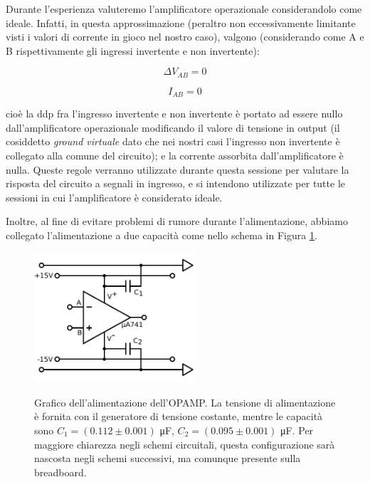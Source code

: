 Durante l'esperienza valuteremo l'amplificatore operazionale considerandolo come ideale. Infatti, in questa approssimazione (peraltro non eccessivamente limitante visti i valori di corrente in gioco nel nostro caso), valgono (considerando come A e B rispettivamente gli ingressi invertente e non invertente):

\begin{equation}
\Delta V_{AB}=0
\label{eq:regola_V}
\end{equation}

\begin{equation}
I_{AB}=0
\label{eq:regola_I}
\end{equation}

cioè la ddp fra l'ingresso invertente e non invertente è portato ad essere nullo dall'amplificatore operazionale modificando il valore di tensione in output (il cosiddetto \textit{ground virtuale} dato che nei nostri casi l'ingresso non invertente è collegato alla comune del circuito); e la corrente assorbita dall'amplificatore è nulla.
Queste regole verranno utilizzate durante questa sessione per valutare la risposta del circuito a segnali in ingresso, e si intendono utilizzate per tutte le sessioni in cui l'amplificatore è considerato ideale.

Inoltre, al fine di evitare problemi di rumore durante l'alimentazione, abbiamo collegato l'alimentazione a due capacità come nello schema in Figura \ref{gr:costante}.

\begin{figure}[ht]
 \centering
   {\includegraphics[width=6cm]{../E01/latex/alimentazione.pdf}}
 \caption{Grafico dell'alimentazione dell'OPAMP. La tensione di alimentazione è fornita con il generatore di tensione costante, mentre le capacità sono $C_1=(0.112 \pm 0.001)$ \si{\micro\farad}, $C_2=(0.095\pm0.001)$ \si{\micro\farad}. Per maggiore chiarezza negli schemi circuitali, questa configurazione sarà nascosta negli schemi successivi, ma comunque presente sulla breadboard.}
 \label{gr:costante}
\end{figure}

